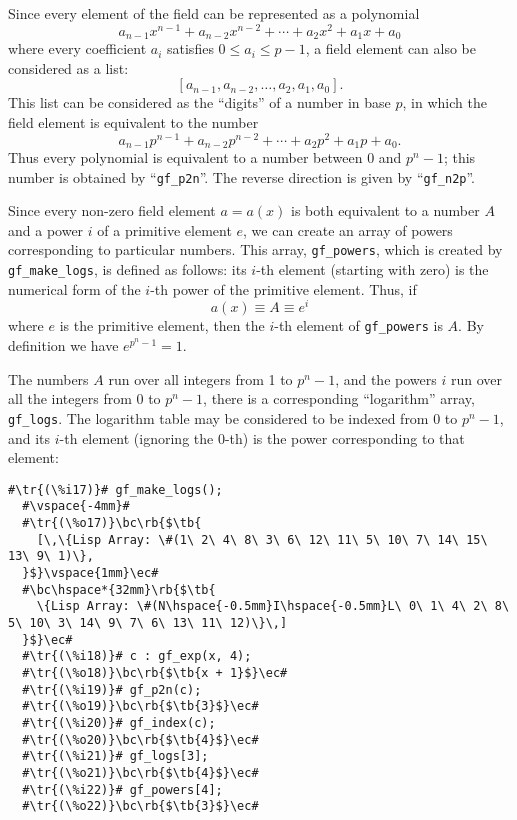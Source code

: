 \documentclass[a4paper,11pt,leqno,fleqn]{artikel3}
\newcommand{\bc}{\begin{center}}
\newcommand{\ec}{\end{center}}
\newcommand{\tr}[1]{\textcolor{red}{#1}}
\newcommand{\tb}[1]{\textcolor{blue}{#1}}
\newcommand{\rb}[1]{\raisebox{2mm}[0mm][1mm]{#1}}
\begin{document}
Since every element of the field can be represented as a polynomial
\[
a_{n-1}x^{n-1}+a_{n-2}x^{n-2}+\cdots+a_2x^2+a_1x+a_0
\]
where every coefficient $a_i$ satisfies $0\le a_i\le p-1$, a field element can
also be considered as a list:
\[
[a_{n-1},a_{n-2},\ldots,a_2,a_1,a_0].
\]
This list can be considered as the ``digits'' of a number in base $p$, in
which the field element is equivalent to the number
\[
a_{n-1}p^{n-1}+a_{n-2}p^{n-2}+\cdots+a_2p^2+a_1p+a_0.
\]
Thus every polynomial is equivalent to a number between 0 and $p^n-1$; this
number is obtained by ``\texttt{gf\_p2n}''. 
The reverse direction is given by ``\texttt{gf\_n2p}''.

Since every non-zero field element $a=a(x)$ is both equivalent to a number $A$
and a power $i$ of a primitive element $e$, we can create an array of powers
corresponding to particular numbers.  This array, \texttt{gf\_powers},
which is created by \verb!gf_make_logs!, 
is defined as follows: 
its $i$-th element (starting with zero) is the numerical form of the $i$-th power of the 
primitive element.  Thus, if
\[
a(x)\equiv A\equiv e^i
\]
where $e$ is the primitive element, then the $i$-th element of \texttt{gf\_powers} is
$A$.  By definition we have $e^{p^n-1}=1$.

The numbers $A$ run over all integers from 1 to $p^n-1$, and the powers $i$
run over all the integers from 0 to $p^n-1$, there is a corresponding
``logarithm'' array, \texttt{gf\_logs}.  
The logarithm table may be considered to be
indexed from 0 to $p^n-1$, and its $i$-th element (ignoring the 0-th) is the power 
corresponding to that element:

\vspace*{2mm}
\begin{lstlisting}[escapechar=\#]
  #\tr{(\%i17)}# gf_make_logs();
  #\vspace{-4mm}#
  #\tr{(\%o17)}\bc\rb{$\tb{
    [\,\{Lisp Array: \#(1\ 2\ 4\ 8\ 3\ 6\ 12\ 11\ 5\ 10\ 7\ 14\ 15\ 13\ 9\ 1)\}, 
  }$}\vspace{1mm}\ec#
  #\bc\hspace*{32mm}\rb{$\tb{
    \{Lisp Array: \#(N\hspace{-0.5mm}I\hspace{-0.5mm}L\ 0\ 1\ 4\ 2\ 8\ 5\ 10\ 3\ 14\ 9\ 7\ 6\ 13\ 11\ 12)\}\,]
  }$}\ec#
  #\tr{(\%i18)}# c : gf_exp(x, 4);
  #\tr{(\%o18)}\bc\rb{$\tb{x + 1}$}\ec#
  #\tr{(\%i19)}# gf_p2n(c);
  #\tr{(\%o19)}\bc\rb{$\tb{3}$}\ec#
  #\tr{(\%i20)}# gf_index(c);
  #\tr{(\%o20)}\bc\rb{$\tb{4}$}\ec#
  #\tr{(\%i21)}# gf_logs[3];
  #\tr{(\%o21)}\bc\rb{$\tb{4}$}\ec#
  #\tr{(\%i22)}# gf_powers[4];
  #\tr{(\%o22)}\bc\rb{$\tb{3}$}\ec#
\end{lstlisting}
\end{document}
